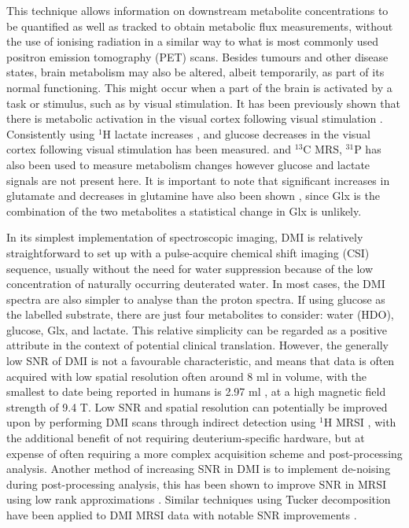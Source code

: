 \documentclass[class=article, crop=false]{standalone}
\begin{document}
This technique allows information on downstream metabolite concentrations to be quantified as well as tracked to obtain metabolic flux measurements, without the use of ionising radiation in a similar way to what is most commonly used positron emission tomography (PET) scans. Besides tumours and other disease states, brain metabolism may also be altered, albeit temporarily, as part of its normal functioning. This might occur when a part of the brain is activated by a task or stimulus, such as by visual stimulation. It has been previously shown that there is metabolic activation in the visual cortex following visual stimulation \cite{Kushner1988CerebralStimulation, Beland-Millar2018FluctuationsStimulation}. Consistently using $^1$H lactate increases \cite{Prichard1991LactateStimulation., Sappey-Marinier1992EffectSpectroscopy, Fernandes2020MeasurementT}, and glucose decreases \cite{Lin2012InvestigatingT} in the visual cortex following visual stimulation has been measured. and $^{13}$C \cite{Chhina2001MeasurementSpectroscopy} MRS, $^{31}$P has also been used to measure metabolism changes \cite{Sappey-Marinier1992EffectSpectroscopy} however glucose and lactate signals are not present here. It is important to note that significant increases in glutamate and decreases in glutamine have also been shown \cite{Lin2012InvestigatingT}, since Glx is the combination of the two metabolites a statistical change in Glx is unlikely. 
 
In its simplest implementation of spectroscopic imaging, DMI is relatively straightforward to set up with a pulse-acquire chemical shift imaging (CSI) sequence, usually without the need for water suppression because of the low concentration of naturally occurring deuterated water. In most cases, the DMI spectra are also simpler to analyse than the proton spectra. If using glucose as the labelled substrate, there are just four metabolites to consider: water (HDO), glucose, Glx, and lactate. This relative simplicity can be regarded as a positive attribute in the context of potential clinical translation. However, the generally low SNR of DMI is not a favourable characteristic, and means that data is often acquired with low spatial resolution often around 8 ml \cite{DeFeyter2021DeuteriumFuture, deGraaf2020OnImaging} in volume, with the smallest to date being reported in humans is 2.97 ml \cite{Ruhm2022Dynamic9.4T}, at a high magnetic field strength of 9.4 T. Low SNR and spatial resolution can potentially be improved upon by performing DMI scans through indirect detection using $^1$H MRSI \cite{vanZijl2020SpectroscopicFluxes, Bednarik2021DeuteriumBrain, Niess2023Reproducibility3T, Ruhm2022Dynamic9.4T}, with the additional benefit of not requiring deuterium-specific hardware, but at expense of often requiring a more complex acquisition scheme and post-processing analysis. Another method of increasing SNR in DMI is to implement de-noising during post-processing analysis, this has been shown to improve SNR in MRSI using low rank approximations \cite{Nguyen2013DenoisingApproximations}. Similar techniques using Tucker decomposition \cite{Tucker1966SomeAnalysis, Bader2007EfficientTensors} have been applied to DMI MRSI data with notable SNR improvements \cite{vonMorze2021ComparisonT, Kreis2020MeasuringMRI}.
\end{document}
